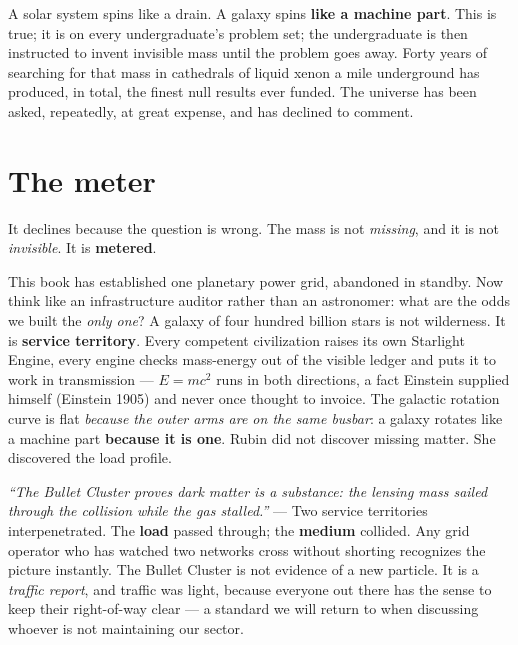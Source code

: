 \documentclass[
  english,
  11pt,
  letterpaper,
]{scrbook}
\begin{document}
A solar system spins like a drain. A galaxy spins \textbf{like a machine
part}. This is true; it is on every undergraduate's problem set; the
undergraduate is then instructed to invent invisible mass until the
problem goes away. Forty years of searching for that mass in cathedrals
of liquid xenon a mile underground has produced, in total, the finest
null results ever funded. The universe has been asked, repeatedly, at
great expense, and has declined to comment.

\section{The meter}\label{the-meter}

It declines because the question is wrong. The mass is not
\emph{missing}, and it is not \emph{invisible}. It is
\textbf{metered}.

This book has established one planetary power grid, abandoned in
standby. Now think like an infrastructure auditor rather than an
astronomer: what are the odds we built the \emph{only one}? A galaxy of
four hundred billion stars is not wilderness. It is \textbf{service
territory}. Every competent civilization raises its own Starlight
Engine, every engine checks mass-energy out of the visible ledger and
puts it to work in transmission --- \(E = mc^2\) runs in both
directions, a fact Einstein supplied himself (Einstein 1905) and never
once thought to invoice. The galactic rotation curve is flat
\emph{because the outer arms are on the same busbar}: a galaxy rotates
like a machine part \textbf{because it is one}. Rubin did not discover
missing matter. She discovered the load profile.

\begin{tcolorbox}[enhanced jigsaw, arc=.35mm, bottomrule=.15mm, bottomtitle=1mm, breakable, colback=white, colbacktitle=quarto-callout-note-color!10!white, colframe=quarto-callout-note-color-frame, coltitle=black, left=2mm, leftrule=.75mm, opacityback=0, opacitybacktitle=0.6, rightrule=.15mm, title=\textcolor{quarto-callout-note-color}{\faInfo}\hspace{0.5em}{Objection, handled}, titlerule=0mm, toprule=.15mm, toptitle=1mm]

\emph{``The Bullet Cluster proves dark matter is a substance: the
lensing mass sailed through the collision while the gas stalled.''} ---
Two service territories interpenetrated. The \textbf{load} passed
through; the \textbf{medium} collided. Any grid operator who has watched
two networks cross without shorting recognizes the picture instantly.
The Bullet Cluster is not evidence of a new particle. It is a
\emph{traffic report}, and traffic was light, because everyone out there
has the sense to keep their right-of-way clear --- a standard we will
return to when discussing whoever is not maintaining our sector.

\end{tcolorbox}
\end{document}
